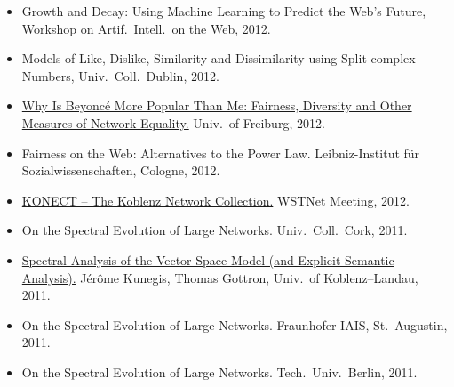 \documentclass[line,mm]{res}
\newcounter{x}
\newcounter{y}
\newcommand{\talknumber}{T\arabic{y}\stepcounter{y}}
\newcounter{z}
\begin{document}
\begin{resume}
\begin{itemize}
    \href{https://github.com/kunegis/pdfs/blob/master/kunegis:modeling-linguistic-networks.presentation.pdf}{Linguistic
      Network Analysis with the Koblenz Network Collection.}  
    Workshop on Modeling Linguist.\ Networks, 2012. 
  \item[{[\talknumber]}] Growth and Decay: Using Machine Learning to Predict the Web's
    Future, Workshop on Artif.\ Intell.\ on the Web, 2012. 
  \item[{[\talknumber]}] Models of Like, Dislike, Similarity and Dissimilarity using
    Split-complex Numbers, Univ.\ Coll.\ Dublin, 2012. 
  \item[{[\talknumber]}] 
    \href{https://www.slideshare.net/kunegis/why-beyonc-is-more-popular-than-me-fairness-diversity-and-other-measures}{Why Is Beyoncé More Popular Than Me:  Fairness, Diversity and
    Other Measures of Network Equality.} Univ.\ of Freiburg, 2012. 
  \item[{[\talknumber]}] Fairness on the Web: Alternatives to the Power
    Law. 
    Leibniz-Institut für Sozialwissenschaften, Cologne, 2012.  
  \item[{[\talknumber]}] 
    \href{https://github.com/kunegis/pdfs/blob/master/kunegis:network-survey.presentation.pdf}{KONECT
      -- The Koblenz Network Collection.}  WSTNet Meeting, 2012.  
  \item[{[\talknumber]}] On the Spectral Evolution of Large Networks.  Univ.\ Coll.\ Cork, 2011.   
  \item[{[\talknumber]}] 
    \href{https://github.com/kunegis/pdfs/blob/master/kunegis:explicit-diagonality.presentation.pdf}{Spectral
      Analysis of the Vector Space Model (and Explicit Semantic Analysis).}
    Jérôme Kunegis, Thomas Gottron, Univ.\ of Koblenz--Landau, 2011. 
  \item[{[\talknumber]}] On the Spectral Evolution of Large Networks.  Fraunhofer IAIS,
    St.\ Augustin, 2011.  
  \item[{[\talknumber]}] On the Spectral Evolution of Large Networks. Tech.\ Univ.\ Berlin, 2011.  

\end{itemize}
\end{resume}
\end{document}
